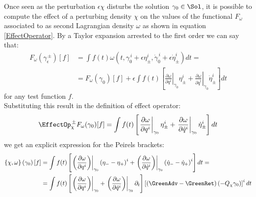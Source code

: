 \documentclass[Main]{subfiles}
\begin{document}
		Once seen as the perturbation $\epsilon \chi$ disturbs the solution $\gamma_0 \in \Sol$, it is possible to compute the effect of a perturbing density $\chi$ on the values of the functional $F_\omega$ associated to as second Lagrangian density $\omega$ as shown in equation \ref{EffectOperator}.
		By a Taylor expansion arrested to the first order we can say that:
		\begin{align*}
			F_\omega \left( \gamma_\epsilon^{\, \pm} \right) [f]&= \int f(t) 
			\omega( t, \gamma_0^{\, i} + \epsilon \eta^i_\pm , \dot{\gamma}_0^{\, i} + \epsilon \dot{\eta}_\pm^i ) dt = \\
			& = 
			F_\omega (\gamma_0) [f] + \epsilon \int f(t) \left[ 
			\left. \frac{\partial\omega}{\partial q^i}\right\vert_{\gamma_0} \eta^i_\pm +
			\left. \frac{\partial\omega}{\partial \dot{q}^i}\right\vert_{\gamma_0} \dot{\eta}^i_\pm 
			 \right] dt
		\end{align*}
		for any test function $f$.\\
		Substituting this result in the definition of effect operator:
		\begin{displaymath}
			\EffectOp_\chi^{\, \pm} F_\omega ( \gamma_0) [f] = \int f(t) \left[ 
			\left. \frac{\partial\omega}{\partial q^i}\right\vert_{\gamma_0} \eta^i_\pm +
			\left. \frac{\partial\omega}{\partial \dot{q}^i}\right\vert_{\gamma_0} \dot{\eta}^i_\pm 
			 \right] dt
		\end{displaymath}
		we get an explicit expression for the Peirels brackets:
		\begin{align}\label{EspressionePeierlsCampiCurve}
			\left\lbrace \chi , \omega \right\rbrace \left( \gamma_0 \right) [f] &=
			\int f(t) \left[ 
			\left.\left( \frac{\partial\omega}{\partial q^i}\right)\right\vert_{\gamma_0} \left( \eta_- - \eta_+\right)^i +
			\left.\left( \frac{\partial\omega}{\partial \dot{q}^i}\right)\right\vert_{\gamma_0} \left( \dot{\eta}_- - \dot{\eta}_+\right)^i 
			 \right] dt = \nonumber\\
			 &= \int f(t) 
			 \left[  
				\left.\left( \frac{\partial\omega}{\partial q^i}\right)\right\vert_{\gamma_0} +
				\left.\left( \frac{\partial\omega}{\partial \dot{q}^i}\right)\right\vert_{\gamma_0} \partial_t
			\right]
			\left[
				\left( \GreenAdv - \GreenRet \right)\left( - Q_\chi \gamma_0 \right)
			\right]^i				dt
		\end{align}
			
		
	 
	 	
\end{document}
